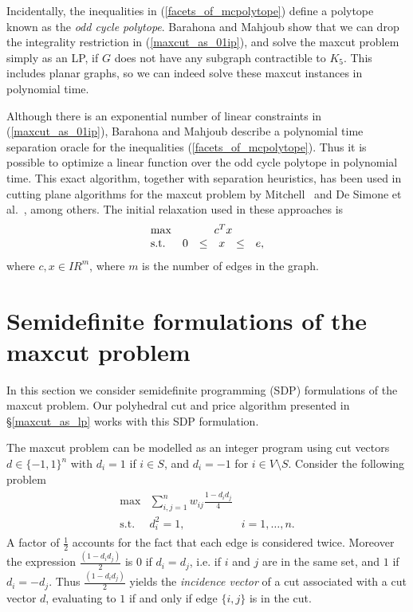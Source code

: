 \documentclass[12pt]{article}
\newcommand{\real}{I\!\!R}
\begin{document}
Incidentally, the inequalities in (\ref{facets_of_mcpolytope})
define a polytope known as the {\em odd cycle polytope}. Barahona
and Mahjoub \cite{barahona4} show that we can drop the integrality
restriction in (\ref{maxcut_as_01ip}), and solve the maxcut
problem simply as an LP, if $G$ does not have any subgraph
contractible to $K_5$. This includes planar graphs, so we can
indeed solve these maxcut instances in polynomial time.

Although there is an exponential number of linear constraints in
(\ref{maxcut_as_01ip}), Barahona and Mahjoub \cite{barahona4}
describe a polynomial time separation oracle for the inequalities
(\ref{facets_of_mcpolytope}). Thus it is possible to optimize a
linear function over the odd cycle polytope in polynomial time.
This exact algorithm, together with separation heuristics, has
been used in cutting plane algorithms for the maxcut problem by
Mitchell~\cite{JEMising} and De Simone et
al.~\cite{desimone1,desimone2}, among others. The initial
relaxation used in these approaches is
\begin{eqnarray}
\label{initial_lp_relaxation}
\begin{array}{lc}
\max & c^Tx  \\
\mbox{s.t.} &  0 \hspace*{0.25cm} \le \hspace*{0.25cm} x
\hspace*{0.25cm} \le \hspace*{0.25cm} e,
\end{array}
\end{eqnarray}
where $c,x \in \real^{m}$, where $m$ is the number of edges in the
graph.

\section{Semidefinite formulations of the maxcut problem}
\label{sdp_formulations_of_maxcut} In this section we consider
semidefinite programming (SDP) formulations of the maxcut problem.
Our polyhedral cut and price algorithm presented in
\S\ref{maxcut_as_lp} works with this SDP formulation.

The maxcut problem can be modelled as an integer program using cut
vectors $d \in \{-1,1\}^n$ with $d_i = 1$ if $i \in S$, and $d_i =
-1$ for $i \in V \setminus S$. Consider the following problem
\begin{eqnarray}
\label{maxcut_as_pm1ip_1}
\begin{array}{ccc}
\max & \displaystyle \sum_{i,j=1}^n w_{ij} \frac{1-d_id_j}{4} \\
\mbox{s.t.} & d_i^2 = 1, & i=1,\ldots,n.
\end{array}
\end{eqnarray}
A factor of $\frac{1}{2}$ accounts for the fact that each edge is
considered twice. Moreover the expression $\frac{(1-d_id_j)}{2}$
is $0$ if $d_i = d_j$, i.e. if $i$ and $j$ are in the same set,
and $1$ if $d_i = -d_j$. Thus $\frac{(1-d_id_j)}{2}$ yields the
{\em incidence vector} of a cut associated with a cut vector $d$,
evaluating to $1$ if and only if edge $\{i,j\}$ is in the cut.
\end{document}
